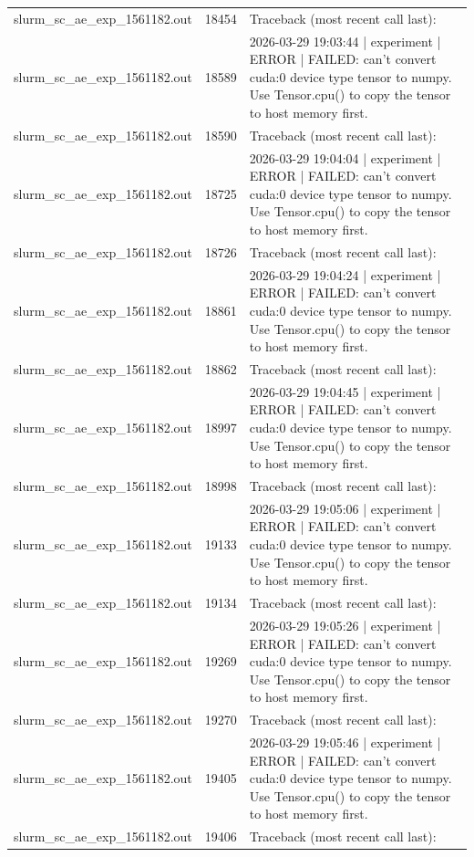 \begin{tabular}{lrl}
slurm\_sc\_ae\_exp\_1561182.out & 18454 & Traceback (most recent call last): \\
slurm\_sc\_ae\_exp\_1561182.out & 18589 & 2026-03-29 19:03:44 | experiment | ERROR |   FAILED: can't convert cuda:0 device type tensor to numpy. Use Tensor.cpu() to copy the tensor to host memory first. \\
slurm\_sc\_ae\_exp\_1561182.out & 18590 & Traceback (most recent call last): \\
slurm\_sc\_ae\_exp\_1561182.out & 18725 & 2026-03-29 19:04:04 | experiment | ERROR |   FAILED: can't convert cuda:0 device type tensor to numpy. Use Tensor.cpu() to copy the tensor to host memory first. \\
slurm\_sc\_ae\_exp\_1561182.out & 18726 & Traceback (most recent call last): \\
slurm\_sc\_ae\_exp\_1561182.out & 18861 & 2026-03-29 19:04:24 | experiment | ERROR |   FAILED: can't convert cuda:0 device type tensor to numpy. Use Tensor.cpu() to copy the tensor to host memory first. \\
slurm\_sc\_ae\_exp\_1561182.out & 18862 & Traceback (most recent call last): \\
slurm\_sc\_ae\_exp\_1561182.out & 18997 & 2026-03-29 19:04:45 | experiment | ERROR |   FAILED: can't convert cuda:0 device type tensor to numpy. Use Tensor.cpu() to copy the tensor to host memory first. \\
slurm\_sc\_ae\_exp\_1561182.out & 18998 & Traceback (most recent call last): \\
slurm\_sc\_ae\_exp\_1561182.out & 19133 & 2026-03-29 19:05:06 | experiment | ERROR |   FAILED: can't convert cuda:0 device type tensor to numpy. Use Tensor.cpu() to copy the tensor to host memory first. \\
slurm\_sc\_ae\_exp\_1561182.out & 19134 & Traceback (most recent call last): \\
slurm\_sc\_ae\_exp\_1561182.out & 19269 & 2026-03-29 19:05:26 | experiment | ERROR |   FAILED: can't convert cuda:0 device type tensor to numpy. Use Tensor.cpu() to copy the tensor to host memory first. \\
slurm\_sc\_ae\_exp\_1561182.out & 19270 & Traceback (most recent call last): \\
slurm\_sc\_ae\_exp\_1561182.out & 19405 & 2026-03-29 19:05:46 | experiment | ERROR |   FAILED: can't convert cuda:0 device type tensor to numpy. Use Tensor.cpu() to copy the tensor to host memory first. \\
slurm\_sc\_ae\_exp\_1561182.out & 19406 & Traceback (most recent call last): \\

\end{tabular}
